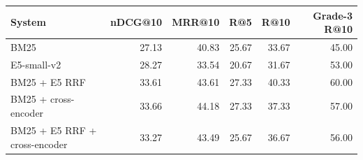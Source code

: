 \begin{tabular}{lrrrrr}
\toprule
System & nDCG@10 & MRR@10 & R@5 & R@10 & Grade-3 R@10 \\
\midrule
BM25 & 27.13 & 40.83 & 25.67 & 33.67 & 45.00 \\
E5-small-v2 & 28.27 & 33.54 & 20.67 & 31.67 & 53.00 \\
BM25 + E5 RRF & 33.61 & 43.61 & 27.33 & 40.33 & 60.00 \\
BM25 + cross-encoder & 33.66 & 44.18 & 27.33 & 37.33 & 57.00 \\
BM25 + E5 RRF + cross-encoder & 33.27 & 43.49 & 25.67 & 36.67 & 56.00 \\
\bottomrule
\end{tabular}
